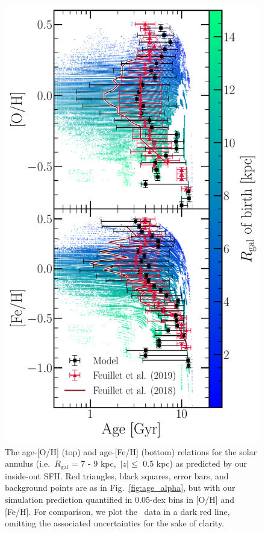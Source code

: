 \documentclass[fleqn, usenatbib]{mnras}
\begin{document}
\begin{figure} 
\centering 
\includegraphics[scale = 0.45]{amr_solar_annulus.pdf} 
\caption{The age-[O/H] (top) and age-[Fe/H] (bottom) relations for the 
solar annulus (i.e.~$R_\text{gal}$ = 7 - 9 kpc,~$\left|z\right|\leq$ 0.5 kpc) 
as predicted by our inside-out SFH. Red triangles, black squares, error bars, 
and background points are as in Fig.~\ref{fig:age_alpha}, 
but with our simulation prediction quantified in 0.05-dex bins in [O/H] and 
[Fe/H]. For comparison, we plot the~\citet{Feuillet2018} data in a dark red 
line, omitting the associated uncertainties for the sake of clarity. } 
\label{fig:amr_solar_annulus} 
\end{figure} 
\end{document}
